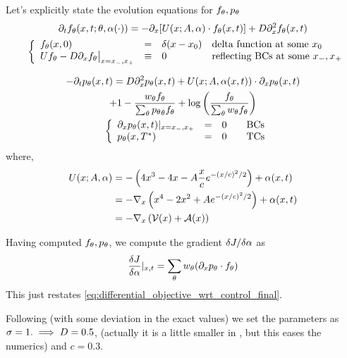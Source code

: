 Let's explicitly state the evolution equations for ${ f_{ \theta}},{ p_{ \theta}}$
\begin{equation}
\begin{gathered}
{\partial}_t { f_{ \theta}}(x,t; { \theta}, \alpha(\cdot)) = -{\partial}_x [ U(x;A, \alpha) \cdot { f_{ \theta}}(x,t)] + D {\partial}_x^2
{ f_{ \theta}}(x,t)
\\
\begin{array}{ll}
	&
	\left\{ \begin{array}{lcll}
	 { f_{ \theta}}(x,0) &=& \delta(x-x_0)  &\textrm{delta function at some } x_0
	\\
	U { f_{ \theta}} - D {\partial}_x { f_{ \theta}} \big|_{x={ x_{-} },{ x_{+} }} &\equiv& 0 & \textrm{reflecting BCs
	at some } { x_{-} }, { x_{+} } \end{array} \right.
\end{array}
\label{eq:forward_density_double_well}
\end{gathered}
\end{equation}

\begin{equation}
\begin{gathered}
-{\partial}_t { p_{ \theta}}(x,t) =
D {\partial}_x^2 { p_{ \theta}}(x,t) +
U(x;A, \alpha(x,t))\cdot {\partial}_x { p_{ \theta}}(x,t) \\
+ 1 - \frac{  w_{ \theta} { f_{ \theta}} }{\sum_{ \theta} { p_{ \theta}}_{ \theta}{ f_{ \theta}}} 
+ \log\left(\frac{f_{ \theta}} {\sum_{ \theta} { w_{ \theta} } { f_{ \theta}} }\right)
\\
\begin{array}{ll}
	&
	\left\{ \begin{array}{lcll}
	{\partial}_x { p_{ \theta}}(x, t)|_{x = { x_{-} }, { x_{+} }}  &=& 0  \quad &\textrm{BCs}
	\\
	{ p_{ \theta}}(x,{ T^* })  &=& 0 \,& \textrm{TCs}
\end{array} \right.
\end{array}
\label{eq:backward_adjoint_double_well}
\end{gathered}
\end{equation}
where,  
\begin{eqnarray*}
U(x; A, \alpha) &= -\left( 4x^3 - 4x -A \frac xc e^{-(x/c)^2/2} \right) + \alpha(x,t)
\\
&= -{ \nabla }_x \left( x^4  - 2x^2 + A e^{-(x/c)^2/2} \right)  + \alpha(x,t)
\\
&= -{ \nabla }_x \left(\mathcal V(x) + \mathcal{A}(x) \right)
\end{eqnarray*}

Having computed ${ f_{ \theta}}, { p_{ \theta}}$, we compute the gradient $\delta J / \delta \alpha$
as
$$
\frac {\delta J}{\delta \alpha} |_{x,t} = \sum_{ \theta} { w_{ \theta} } ({\partial}_x { p_{ \theta}} \cdot { f_{ \theta}})
$$
This just restates \cref{eq:differential_objective_wrt_control_final}.

Following \cite{Lin} (with some deviation in the exact values) we set the
parameters as $\sigma = 1. \implies D = 0.5$, (actually it is a little smaller in
\cite{Lin}, but this eases the numerics) and $c = 0.3$.

